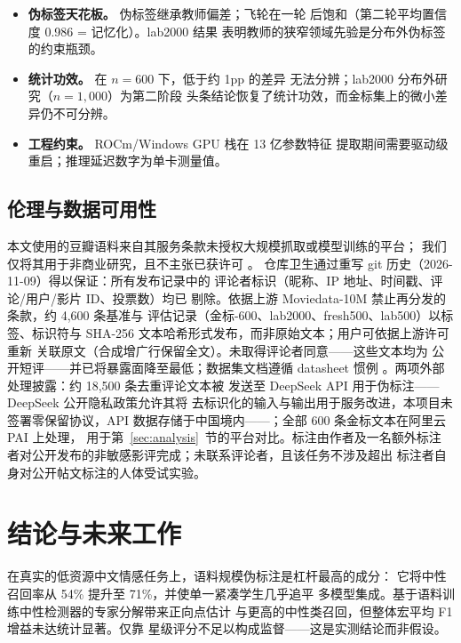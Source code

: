 \documentclass[11pt,a4paper]{article}
\newcommand{\code}[1]{\texttt{#1}}
\begin{document}
\begin{itemize}
        另有 200 行第二人类标注
        IAA 抽样（$\kappa = 0.57$，为人—参照标签的混合口径而非
        纯人—人 IAA）。共识标签可靠但非绝对正确；
        数据按行发布了来源标记（\code{final\_source}）。
  \item \textbf{伪标签天花板。} 伪标签继承教师偏差；飞轮在一轮
        后饱和（第二轮平均置信度 0.986 = 记忆化）。lab2000 结果
        表明教师的狭窄领域先验是分布外伪标签的约束瓶颈。
  \item \textbf{统计功效。} 在 $n=600$ 下，低于约 1pp 的差异
        无法分辨；lab2000 分布外研究（$n=1{,}000$）为第二阶段
        头条结论恢复了统计功效，而金标集上的微小差异仍不可分辨。
  \item \textbf{工程约束。} ROCm/Windows GPU 栈在 13 亿参数特征
        提取期间需要驱动级重启；推理延迟数字为单卡测量值。
\end{itemize}

\subsection{伦理与数据可用性}
\label{sec:ethics}

本文使用的豆瓣语料来自其服务条款未授权大规模抓取或模型训练的平台；
我们仅将其用于非商业研究，且不主张已获许可 \citep{bender2018}。
仓库卫生通过重写 git 历史（2026-11-09）得以保证：所有发布记录中的
评论者标识（昵称、IP 地址、时间戳、评论/用户/影片 ID、投票数）均已
剔除。依据上游 Moviedata-10M 禁止再分发的条款，约 4{,}600 条基准与
评估记录（金标-600、lab2000、fresh500、lab500）以标签、标识符与
SHA-256 文本哈希形式发布，而非原始文本；用户可依据上游许可重新
关联原文（合成增广行保留全文）。未取得评论者同意——这些文本均为
公开短评——并已将暴露面降至最低；数据集文档遵循 datasheet 惯例
\citep{gebru2021}。两项外部处理披露：约 18{,}500 条去重评论文本被
发送至 DeepSeek API 用于伪标注——DeepSeek 公开隐私政策允许其将
去标识化的输入与输出用于服务改进，本项目未签署零保留协议，API
数据存储于中国境内——；全部 600 条金标文本在阿里云 PAI 上处理，
用于第~\ref{sec:analysis}~节的平台对比。标注由作者及一名额外标注
者对公开发布的非敏感影评完成；未联系评论者，且该任务不涉及超出
标注者自身对公开帖文标注的人体受试实验。

\section{结论与未来工作}
\label{sec:conclusion}

在真实的低资源中文情感任务上，语料规模伪标注是杠杆最高的成分：
它将中性召回率从 54\% 提升至 71\%，并使单一紧凑学生几乎追平
多模型集成。基于语料训练中性检测器的专家分解带来正向点估计
与更高的中性类召回，但整体宏平均 F1 增益未达统计显著。仅靠
星级评分不足以构成监督——这是实测结论而非假设。
\end{document}
